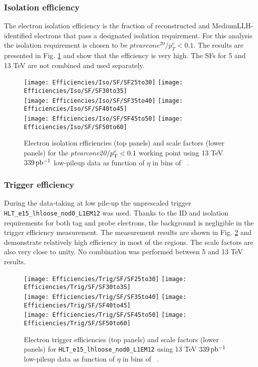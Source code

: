     
    \subsubsection{Isolation efficiency}
    The electron isolation efficiency is the fraction of reconstructed and MediumLLH-identified electrons that pass a designated isolation requirement. For this analysis the isolation requirement is chosen to be $ptvarcone^{20}/p_T^e<0.1$. The results are presented in Fig. \ref{fig:iso_sf_all} and show that the efficiency is very high. The SFs for 5 and 13 TeV are not combined and used separately.
    
    \begin{figure}[htbp]
    	\centering
    	\texttt{[image: Efficiencies/Iso/SF/SF25to30]}
    	\texttt{[image: Efficiencies/Iso/SF/SF30to35]}\\
    	\texttt{[image: Efficiencies/Iso/SF/SF35to40]}
    	\texttt{[image: Efficiencies/Iso/SF/SF40to45]} \\
    	\texttt{[image: Efficiencies/Iso/SF/SF45to50]}
    	\texttt{[image: Efficiencies/Iso/SF/SF50to60]}
    	\caption{Electron isolation efficiencies (top panels) and scale
    		factors (lower panels) for the \emph{ptvarcone20}$/p_{\text{T}}^e < 0.1$
    		working point using 13 TeV $339\,\mbox{pb\(^{-1}\)}$ low-pileup data as function
    		of $\eta$ in bins of \pt~\cite{int_note_electrons}.}
    	\label{fig:iso_sf_all}
    \end{figure}
    \subsubsection{Trigger efficiency}
    During the data-taking at low pile-up the unprescaled trigger \texttt{HLT\_e15\_lhloose\_nod0\_L1EM12} was used. Thanks to the ID and isolation requirements for both tag and probe electrons, the background is negligible in the trigger efficiency measurement. The measurement results are shown in Fig. \ref{fig:trig_sf_all} and demonstrate relatively high efficiency in most of the regions. The scale factors are also very close to unity. No combination was performed between 5 and 13 TeV results.
    
    \begin{figure}[htbp]
    	\centering
    	\texttt{[image: Efficiencies/Trig/SF/SF25to30]}
    	\texttt{[image: Efficiencies/Trig/SF/SF30to35]}\\
    	\texttt{[image: Efficiencies/Trig/SF/SF35to40]}
    	\texttt{[image: Efficiencies/Trig/SF/SF40to45]} \\
    	\texttt{[image: Efficiencies/Trig/SF/SF45to50]}
    	\texttt{[image: Efficiencies/Trig/SF/SF50to60]}
    	\caption{Electron trigger efficiencies (top panels) and scale
    		factors (lower panels) for \texttt{HLT\_e15\_lhloose\_nod0\_L1EM12}
    		using 13 TeV $339\,\mbox{pb\(^{-1}\)}$ low-pileup data as function
    		of $\eta$ in bins of \pt~\cite{int_note_electrons}.}
    	\label{fig:trig_sf_all}
    \end{figure}
    
